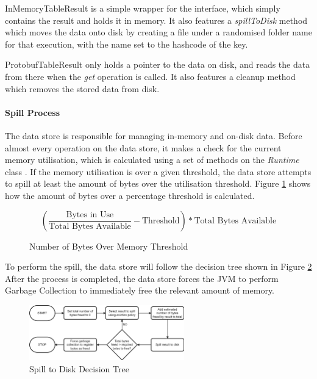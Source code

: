 InMemoryTableResult is a simple wrapper for the interface, which simply contains the result and holds it in memory. It also features a \textit{spillToDisk} method which moves the data onto disk by creating a file under a randomised folder name for that execution, with the name set to the hashcode of the key. 

ProtobufTableResult only holds a pointer to the data on disk, and reads the data from there when the \textit{get} operation is called. It also features a cleanup method which removes the stored data from disk.

\paragraph{Spill Process}
The data store is responsible for managing in-memory and on-disk data. Before almost every operation on the data store, it makes a check for the current memory utilisation, which is calculated using a set of methods on the \textit{Runtime} class . If the memory utilisation is over a given threshold, the data store attempts to spill at least the amount of bytes over the utilisation threshold. Figure \ref{fig:bytes-over-memory-threshold} shows how the amount of bytes over a percentage threshold is calculated.

\begin{figure}[h]
	\centering
	\[ \left( \frac{\text{Bytes in Use}}{\text{Total Bytes Available}} - \text{Threshold} \right) * \text{Total Bytes Available} \]
	\caption{Number of Bytes Over Memory Threshold}
	\label{fig:bytes-over-memory-threshold}
\end{figure}

To perform the spill, the data store will follow the decision tree shown in Figure \ref{fig:spill-to-disk-process} After the process is completed, the data store forces the JVM to perform Garbage Collection to immediately free the relevant amount of memory.

\begin{figure}[h]
	\centering
	\includegraphics[width=0.6\textwidth]{chapters/diagrams/implementation/spill-to-disk-process}
	\caption{Spill to Disk Decision Tree}
	\label{fig:spill-to-disk-process}
\end{figure}

